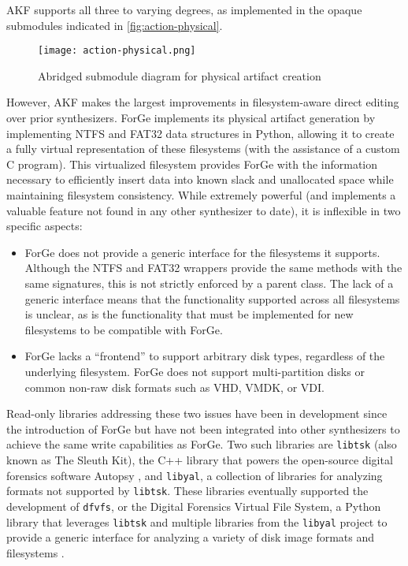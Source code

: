 AKF supports all three to varying degrees, as implemented in the opaque
submodules indicated in \autoref{fig:action-physical}.

\begin{figure*}[htbp]
\centering
\texttt{[image: action-physical.png]}
\caption{Abridged submodule diagram for physical artifact
creation}\label{fig:action-physical}
\end{figure*}

However, AKF makes the largest improvements in filesystem-aware direct
editing over prior synthesizers. ForGe
\cite{vistiAutomaticCreationComputer2015} implements its physical
artifact generation by implementing NTFS and FAT32 data structures in
Python, allowing it to create a fully virtual representation of these
filesystems (with the assistance of a custom C program). This
virtualized filesystem provides ForGe with the information necessary to
efficiently insert data into known slack and unallocated space while
maintaining filesystem consistency. While extremely powerful (and
implements a valuable feature not found in any other synthesizer to
date), it is inflexible in two specific aspects:

\begin{itemize}
\item
  ForGe does not provide a generic interface for the filesystems it
  supports. Although the NTFS and FAT32 wrappers provide the same
  methods with the same signatures, this is not strictly enforced by a
  parent class. The lack of a generic interface means that the
  functionality supported across all filesystems is unclear, as is the
  functionality that must be implemented for new filesystems to be
  compatible with ForGe.
\item
  ForGe lacks a ``frontend'' to support arbitrary disk types, regardless
  of the underlying filesystem. ForGe does not support multi-partition
  disks or common non-raw disk formats such as VHD, VMDK, or VDI.
\end{itemize}

Read-only libraries addressing these two issues have been in development
since the introduction of ForGe but have not been integrated into other
synthesizers to achieve the same write capabilities as ForGe. Two such
libraries are \passthrough{\lstinline!libtsk!} (also known as The Sleuth
Kit), the C++ library that powers the open-source digital forensics
software Autopsy \cite{SleuthkitSleuthkit2025}, and
\passthrough{\lstinline!libyal!}, a collection of libraries for
analyzing formats not supported by \passthrough{\lstinline!libtsk!}.
These libraries eventually supported the development of
\passthrough{\lstinline!dfvfs!}, or the Digital Forensics Virtual File
System, a Python library that leverages \passthrough{\lstinline!libtsk!}
and multiple libraries from the \passthrough{\lstinline!libyal!} project
to provide a generic interface for analyzing a variety of disk image
formats and filesystems \cite{Log2timelineDfvfs2025}.

